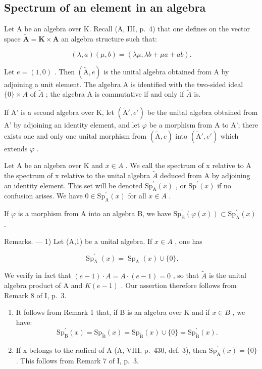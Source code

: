 \subsection{Spectrum of an element in an algebra}

Let A be an algebra over K. Recall (A, III, p.~4) that one defines on the vector space \(\widetilde{\mathbf{A}} = \mathbf{K} \times \mathbf{A}\) an algebra structure such that:

\[
(\lambda , a) (\mu , b) = (\lambda \mu , \lambda b + \mu a + a b).
\]

Let \(e = (1, 0)\) . Then \((\tilde{\mathrm{A}}, e)\) is the unital algebra obtained from A by adjoining a unit element. The algebra A is identified with the two-sided ideal \(\{0\} \times A\) of \(\tilde{A}\) ; the algebra A is commutative if and only if \(\tilde{A}\) is.

If A' is a second algebra over K, let \((\tilde{\mathrm{A}}', e')\) be the unital algebra obtained from A' by adjoining an identity element, and let \(\varphi\) be a morphism from A to A'; there exists one and only one unital morphism from \((\tilde{\mathrm{A}}, e)\) into \((\tilde{\mathrm{A}}', e')\) which extends \(\varphi\) .

Let A be an algebra over K and \(x \in A\) . We call the spectrum of x relative to A the spectrum of x relative to the unital algebra \(\widetilde{A}\) deduced from A by adjoining an identity element. This set will be denoted \(\mathrm{Sp}_{\mathrm{A}}^{\prime}(x)\) , or \(\mathrm{Sp}^{\prime}(x)\) if no confusion arises. We have \(0 \in \mathrm{Sp}_{\mathrm{A}}^{\prime}(x)\) for all \(x \in A\) .

If \(\varphi\) is a morphism from A into an algebra B, we have \(\mathrm{Sp}_{\mathrm{B}}^{\prime}(\varphi(x)) \subset \mathrm{Sp}_{\mathrm{A}}^{\prime}(x)\) .

Remarks. --- 1) Let (A,1) be a unital algebra. If \(x \in A\) , one has

\[
\operatorname{Sp} _ {\mathrm{A}} ^ {\prime} (x) = \operatorname{Sp} _ {\mathrm{A}} (x) \cup \{0 \}.
\]

We verify in fact that \((e-1) \cdot A = A \cdot (e-1) = 0\) , so that \(\widetilde{A}\) is the unital algebra product of A and \(K(e-1)\) . Our assertion therefore follows from Remark 8 of I, p.~3.

\begin{enumerate}
\def\labelenumi{\arabic{enumi})}
\setcounter{enumi}{1}
\tightlist
\item
  It follows from Remark 1 that, if B is an algebra over K and if \(x \in B\) , we have:
\[
\mathrm{Sp} _ {\mathrm{B}} ^ {\prime} (x) = \mathrm{Sp} _ {\widetilde {\mathrm{B}}} (x) = \mathrm{Sp} _ {\widetilde {\mathrm{B}}} (x) \cup \{0 \} = \mathrm{Sp} _ {\widetilde {\mathrm{B}}} ^ {\prime} (x).
\]

\item
  If x belongs to the radical of A (A, VIII, p.~430, def. 3), then \(\mathrm{Sp}_{\mathrm{A}}^{\prime}(x)=\{0\}\). This follows from Remark 7 of I, p.~3.
\end{enumerate}

